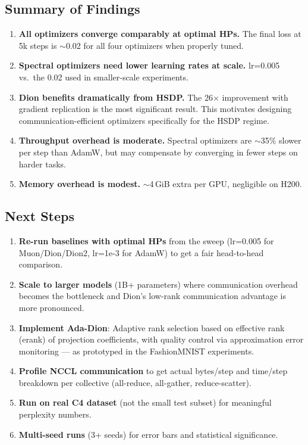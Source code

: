 \documentclass[11pt,a4paper]{article}
\begin{document}
\subsection{Summary of Findings}
\begin{enumerate}
    \item \textbf{All optimizers converge comparably at optimal HPs.} The final loss at 5k steps is $\sim$0.02 for all four optimizers when properly tuned.
    \item \textbf{Spectral optimizers need lower learning rates at scale.} lr=0.005 vs.\ the 0.02 used in smaller-scale experiments.
    \item \textbf{Dion benefits dramatically from HSDP.} The 26$\times$ improvement with gradient replication is the most significant result. This motivates designing communication-efficient optimizers specifically for the HSDP regime.
    \item \textbf{Throughput overhead is moderate.} Spectral optimizers are $\sim$35\% slower per step than AdamW, but may compensate by converging in fewer steps on harder tasks.
    \item \textbf{Memory overhead is modest.} $\sim$4\,GiB extra per GPU, negligible on H200.
\end{enumerate}

\subsection{Next Steps}
\begin{enumerate}
    \item \textbf{Re-run baselines with optimal HPs} from the sweep (lr=0.005 for Muon/Dion/Dion2, lr=1e-3 for AdamW) to get a fair head-to-head comparison.
    \item \textbf{Scale to larger models} (1B+ parameters) where communication overhead becomes the bottleneck and Dion's low-rank communication advantage is more pronounced.
    \item \textbf{Implement Ada-Dion}: Adaptive rank selection based on effective rank (erank) of projection coefficients, with quality control via approximation error monitoring --- as prototyped in the FashionMNIST experiments.
    \item \textbf{Profile NCCL communication} to get actual bytes/step and time/step breakdown per collective (all-reduce, all-gather, reduce-scatter).
    \item \textbf{Run on real C4 dataset} (not the small test subset) for meaningful perplexity numbers.
    \item \textbf{Multi-seed runs} (3+ seeds) for error bars and statistical significance.
\end{enumerate}
\end{document}
